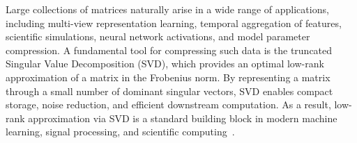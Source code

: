 \documentclass[10pt]{article} %
\begin{document}

Large collections of matrices naturally arise in a wide range of applications, including multi-view representation learning, temporal aggregation of features, scientific simulations, neural network activations, and model parameter compression.
A fundamental tool for compressing such data is the truncated Singular Value Decomposition (SVD), which provides an optimal low-rank approximation of a matrix in the Frobenius norm.
By representing a matrix through a small number of dominant singular vectors, SVD enables compact storage, noise reduction, and efficient downstream computation.
As a result, low-rank approximation via SVD is a standard building block in modern machine learning, signal processing, and scientific computing~\citep{svd_image_compression, svd_multiview, svd_recommender, jolliffe2002pca}.
\end{document}
